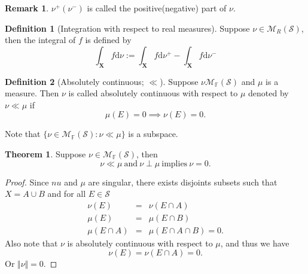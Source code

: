 \documentclass[12pt]{book}
\theoremstyle{definition}
\newtheorem{definition}{Definition}[chapter]
\newtheorem{theorem}{Theorem}[chapter]
\newtheorem{remark}{Remark}
\newcommand{\F}{\mathbb{F}}
\newcommand{\X}{\mathbf{X}}
\newcommand{\D}{\mathrm{d}}
\newcommand{\M}{\mathcal{M}}
\begin{document}
\begin{remark} $\nu^+(\nu^-)$ is called the positive(negative) part of $\nu$.
\end{remark}

\begin{definition}[Integration with respect to real measures]
Suppose $\nu \in \M_R(\mathcal S)$, then the integral of $f$ is defined by
$$
\int_\X f \D \nu := \int_\X f \D \nu^+ - \int_\X f \D \nu^-
$$
\end{definition}





\begin{definition}[Absolutely continuous; $\ll$]
Suppose $\nu \M_\F(\mathcal S)$ and $\mu$ is a measure. Then $\nu$ is called absolutely continuous with respect to $\mu$ denoted by $\nu \ll \mu$ if 
$$
\mu(E)=0 \implies \nu(E)=0. 
$$
\end{definition}
Note that $\{\nu \in \M_\F(\mathcal S): \nu \ll \mu\}$ is a subspace.

\begin{theorem}
Suppose $\nu \in \M_\F(\mathcal S)$, then
$$
\nu \ll \mu \ \text{and} \ \nu \perp \mu \ \text{implies} \ \nu=0. 
$$	
\end{theorem}
\begin{proof}
Since $nu$ and $\mu$ are singular, there exists disjoints subsets such that $X=A\cup B$ and for all $E\in \mathcal S$ 
\begin{eqnarray*}
	\nu(E) &=& \nu(E\cap A) \\
	\mu(E) &=& \mu(E\cap B) \\
	\mu(E\cap A) &=& \mu(E\cap A \cap B) = 0.
\end{eqnarray*}
Also note that $\nu$ is absolutely continuous with respect to $\mu$, and thus we have
$$
\nu(E) = \nu(E \cap A) =0.
$$
Or $\Vert \nu \Vert=0$.
\end{proof}
\end{document}
